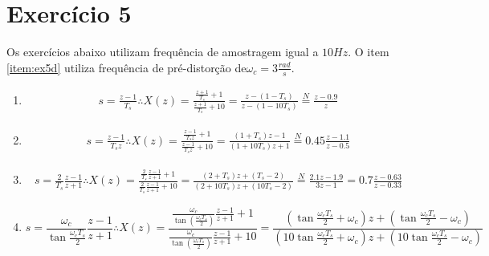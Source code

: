 \section*{Exercício 5}
\label{ex:5}
    
    Os exercícios abaixo utilizam frequência de amostragem igual a $10 Hz$. O item \ref{item:ex5d} utiliza frequência de pré-distorção de$\omega_c = 3 \frac{rad}{s}$.
    
    \begin{enumerate}
        \item %
            \begin{equation}
                \begin{split}
                    s = \frac{z - 1}{T_s} \therefore X(z) = \frac{\frac{z+1}{T_s} + 1}{\frac{z+1}{T_s} + 10} = \frac{z - (1-T_s)}{z - (1-10T_s)} \stackrel{N}{=} \frac{z - 0.9}{z} 
                \end{split}
            \end{equation}
        
        \item %
            \begin{equation}
                \begin{split}
                    s = \frac{z - 1}{T_s z} \therefore X(z) = \frac{\frac{z-1}{T_s z} + 1}{\frac{z-1}{T_s z} + 10} = \frac{(1+T_s) z - 1}{(1 + 10T_s) z + 1} \stackrel{N}{=} 0.45 \frac{z - 1.1}{z - 0.5}
                \end{split}
            \end{equation}
        
        \item %
            \begin{equation}
                \begin{split}
                    s = \frac{2}{T_s} \frac{z - 1}{z+1} \therefore X(z) = \frac{\frac{2}{T_s} \frac{z-1}{z+1} + 1}{\frac{2}{T_s} \frac{z-1}{z+1} + 10} = \frac{(2+T_s)z + (T_s - 2)}{(2 + 10T_s) z + (10 T_s - 2)} \stackrel{N}{=} \frac{2.1z - 1.9}{3z - 1} = 0.7\frac{z-0.63}{z-0.33}
                \end{split}
            \end{equation}
        
        \item %
        \label{item:ex5d}
            \begin{equation}
                s = \frac{\omega_c}{\tan{\frac{\omega_c T_s}{2}}} \frac{z-1}{z+1} \therefore X(z) = \frac{\frac{\omega_c}{\tan(\frac{\omega_c T_s}{2})} \frac{z-1}{z+1} + 1}{\frac{\omega_c}{\tan(\frac{\omega_c T_s}{2})} \frac{z-1}{z+1} + 10} = \frac{(\tan{\frac{\omega_c T_s}{2}} + \omega_c) z + (\tan{\frac{\omega_c T_s}{2}} - \omega_c)}{(10 \tan{\frac{\omega_c T_s}{2}} + \omega_c) z + (10 \tan{\frac{\omega_c T_s}{2}} - \omega_c)} 
            \end{equation}
            

\end{enumerate}
